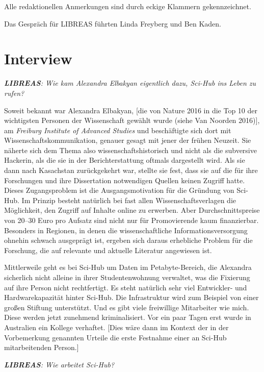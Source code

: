 \documentclass[a4paper,
fontsize=11pt,
oneside,
numbers=noperiodatend,
parskip=half-,
bibliography=totoc,
final
]{scrartcl}
\begin{document}
Alle redaktionellen Anmerkungen sind durch eckige Klammern
gekennzeichnet.

Das Gespräch für LIBREAS führten Linda Freyberg und Ben Kaden.

\hypertarget{interview}{%
\section*{Interview}\label{interview}}

\emph{\textbf{LIBREAS}: Wie kam Alexandra Elbakyan eigentlich dazu,
Sci-Hub ins Leben zu rufen?}

Soweit bekannt war Alexandra Elbakyan, {[}die von Nature 2016 in die Top
10 der wichtigsten Personen der Wissenschaft gewählt wurde (siehe Van
Noorden 2016){]}, am \emph{Freiburg Institute of Advanced Studies} und
beschäftigte sich dort mit Wissenschaftskommunikation, genauer gesagt
mit jener der frühen Neuzeit. Sie näherte sich dem Thema also
wissenschaftshistorisch und nicht als die subversive Hackerin, als die
sie in der Berichterstattung oftmals dargestellt wird. Als sie dann nach
Kasachstan zurückgekehrt war, stellte sie fest, dass sie auf die für
ihre Forschungen und ihre Dissertation notwendigen Quellen keinen
Zugriff hatte. Dieses Zugangsproblem ist die Ausgangsmotivation für die
Gründung von Sci-Hub. Im Prinzip besteht natürlich bei fast allen
Wissenschaftsverlagen die Möglichkeit, den Zugriff auf Inhalte online zu
erwerben. Aber Durchschnittspreise von 20--30 Euro pro Aufsatz sind
nicht nur für Promovierende kaum finanzierbar. Besonders in Regionen, in
denen die wissenschaftliche Informationsversorgung ohnehin schwach
ausgeprägt ist, ergeben sich daraus erhebliche Problem für die
Forschung, die auf relevante und aktuelle Literatur angewiesen ist.

Mittlerweile geht es bei Sci-Hub um Daten im Petabyte-Bereich, die
Alexandra sicherlich nicht alleine in ihrer Studentenwohnung verwaltet,
was die Fixierung auf ihre Person nicht rechtfertigt. Es steht natürlich
sehr viel Entwickler- und Hardwarekapazität hinter Sci-Hub. Die
Infrastruktur wird zum Beispiel von einer großen Stiftung unterstützt.
Und es gibt viele freiwillige Mitarbeiter wie mich. Diese werden jetzt
zunehmend kriminalisiert. Vor ein paar Tagen erst wurde in Australien
ein Kollege verhaftet. {[}Dies wäre dann im Kontext der in der
Vorbemerkung genannten Urteile die erste Festnahme einer an Sci-Hub
mitarbeitenden Person.{]}

\emph{\textbf{LIBREAS}: Wie arbeitet Sci-Hub?}
\end{document}
